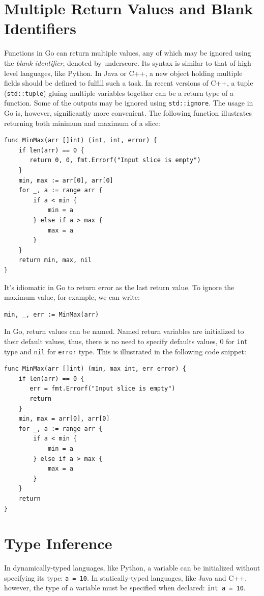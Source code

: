 \documentclass[11pt]{article}
\begin{document}
\section*{Multiple Return Values and Blank Identifiers}
\label{sec:orgheadline12}
Functions in Go can return multiple values, any of which may be ignored using the \emph{blank identifier}, denoted by underscore. Its syntax is similar to that of high-level languages, like Python. In Java or C++, a new object holding multiple fields should be defined to fulfill such a task. In recent versions of C++, a tuple (\texttt{std::tuple}) gluing multiple variables together can be a return type of a function. Some of the outputs may be ignored using \texttt{std::ignore}. The usage in Go is, however, significantly more convenient. The following function illustrates returning both minimum and maximum of a slice:
\begin{verbatim}
func MinMax(arr []int) (int, int, error) {
	if len(arr) == 0 {
	   return 0, 0, fmt.Errorf("Input slice is empty")
	}
	min, max := arr[0], arr[0]
	for _, a := range arr {
		if a < min {
			min = a
		} else if a > max {
			max = a
		}
	}
	return min, max, nil
}
\end{verbatim}
It's idiomatic in Go to return error as the last return value. To ignore the maximum value, for example, we can write:
\begin{verbatim}
min, _, err := MinMax(arr)
\end{verbatim}
In Go, return values can be named. Named return variables are initialized to their default values, thus, there is no need to specify defaults values, 0 for \texttt{int} type and \texttt{nil} for \texttt{error} type. This is illustrated in the following code snippet:
\begin{verbatim}
func MinMax(arr []int) (min, max int, err error) {
	if len(arr) == 0 {
	   err = fmt.Errorf("Input slice is empty")
	   return
	}
	min, max = arr[0], arr[0]
	for _, a := range arr {
		if a < min {
			min = a
		} else if a > max {
			max = a
		}
	}
	return
}
\end{verbatim}

\section*{Type Inference}
\label{sec:orgheadline13}
In dynamically-typed languages, like Python, a variable can be initialized without specifying its type: \texttt{a = 10}. In statically-typed languages, like Java and C++, however, the type of a variable must be specified when declared: \texttt{int a = 10}.
\end{document}
